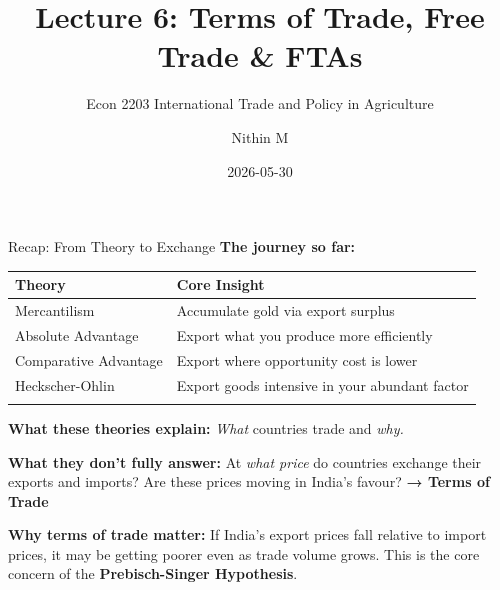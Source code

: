 \documentclass[
  ignorenonframetext,
  aspectratio=169,
]{beamer}
\title[L6 \textbar{} Terms of Trade \& FTAs]{Lecture 6: Terms of Trade,
Free Trade \& FTAs}
\subtitle{Econ 2203 \textbar{} International Trade and Policy in
Agriculture}
\author{Nithin M}
\date{2026-05-30}
\institute{Department of Development Economics}
\makeatletter
\let\quarto@originallabel\label
\DeclareRobustCommand*{\label}[1]{\quarto@originallabel{#1}}
\makeatother
\begin{document}
\frame{\titlepage}


\begin{frame}{Recap: From Theory to Exchange}
\label{recap-from-theory-to-exchange}
\textbf{The journey so far:}

\begin{longtable}[]{@{}ll@{}}
\toprule\noalign{}
Theory & Core Insight \\
\midrule\noalign{}
\endhead
Mercantilism & Accumulate gold via export surplus \\
Absolute Advantage & Export what you produce more efficiently \\
Comparative Advantage & Export where opportunity cost is lower \\
Heckscher-Ohlin & Export goods intensive in your abundant factor \\
\bottomrule\noalign{}
\end{longtable}

\textbf{What these theories explain:} \emph{What} countries trade and
\emph{why.}

\textbf{What they don't fully answer:} At \emph{what price} do countries
exchange their exports and imports? Are these prices moving in India's
favour? \textbf{→ Terms of Trade}

\textbf{Why terms of trade matter:} If India's export prices fall
relative to import prices, it may be getting poorer even as trade volume
grows. This is the core concern of the \textbf{Prebisch-Singer
Hypothesis}.
\end{frame}
\end{document}
